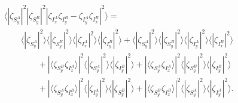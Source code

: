 \documentclass[aps,twocolumn,secnumarabic,amsmath,amssymb,pra,groupedaddress,
showpacs, showkeys]{revtex4-1}
\begin{document}
\begin{align}
& \langle |\zeta_{S_y^A}|^2  |\zeta_{S_y^B}|^2|\zeta_{I_x^A}\zeta_{I_y^B}-\zeta_{I_y^A}\zeta_{I_x^B}|^2 \rangle = \nonumber \\
& \qquad\langle |\zeta_{S_y^A}|^2\rangle \langle |\zeta_{S_y^B}|^2\rangle \langle |\zeta_{I_x^A}|^2\rangle \langle |\zeta_{I_y^B}|^2\rangle + \langle |\zeta_{S_y^A}|^2\rangle \langle |\zeta_{S_y^B}|^2\rangle \langle |\zeta_{I_y^A}|^2\rangle \langle |\zeta_{I_x^B}|^2\rangle \nonumber \\
       & \qquad\qquad + |\langle \zeta_{S_y^B} \zeta_{I_x^A}\rangle|^2 \langle| \zeta_{S_y^A}|^2\rangle \langle|\zeta_{I_y^B}|^2\rangle + |\langle \zeta_{S_y^A} \zeta_{I_x^A}\rangle|^2 \langle| \zeta_{S_y^B}|^2\rangle \langle|\zeta_{I_y^B}|^2\rangle  \nonumber \\
       & \qquad\qquad + |\langle \zeta_{S_y^A} \zeta_{I_x^B}\rangle|^2 \langle| \zeta_{I_y^A}|^2\rangle \langle|\zeta_{S_y^B}|^2\rangle + |\langle \zeta_{S_y^B} \zeta_{I_x^B}\rangle|^2 \langle| \zeta_{S_y^A}|^2\rangle \langle|\zeta_{I_y^A}|^2\rangle.\label{eq:yy:moment}
\end{align}
\end{document}
